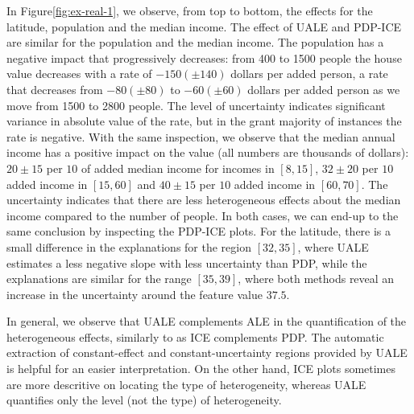 \documentclass[twoside]{article}
\begin{document}
In Figure\ref{fig:ex-real-1}, we observe, from top to bottom, the
effects for the latitude, population and the median income. The effect
of UALE and PDP-ICE are similar for the population and the median
income. The population has a negative impact that progressively
decreases: from 400 to 1500 people the house value decreases with a
rate of \(-150 (\pm 140)\) dollars per added person, a rate that
decreases from \(-80 (\pm 80)\) to \(-60 (\pm 60)\) dollars per added
person as we move from 1500 to 2800 people. The level of uncertainty
indicates significant variance in absolute value of the rate, but in
the grant majority of instances the rate is negative. With the same
inspection, we observe that the median annual income has a positive
impact on the value (all numbers are thousands of dollars):
\(20\pm 15\) per \(10\) of added median income for incomes in
\([8, 15]\), \(32 \pm 20\) per \(10\) added income in \([15, 60]\) and
\(40 \pm 15\) per \(10\) added income in \([60, 70]\). The uncertainty
indicates that there are less heterogeneous effects about the median
income compared to the number of people. In both cases, we can end-up
to the same conclusion by inspecting the PDP-ICE plots. For the
latitude, there is a small difference in the explanations for the
region \([32, 35]\), where UALE estimates a less negative slope with
less uncertainty than PDP, while the explanations are similar for the
range \([35,39]\), where both methods reveal an increase in the
uncertainty around the feature value \(37.5\).

In general, we observe that UALE complements ALE in the quantification
of the heterogeneous effects, similarly to as ICE complements PDP. The
automatic extraction of constant-effect and constant-uncertainty
regions provided by UALE is helpful for an easier interpretation. On
the other hand, ICE plots sometimes are more descritive on locating
the type of heterogeneity, whereas UALE quantifies only the level (not
the type) of heterogeneity.
\end{document}

